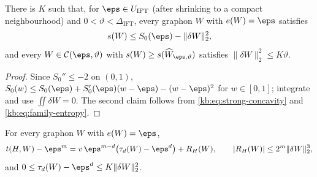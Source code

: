 \begin{lemma}[Localization]\label{kb:lem:localization}
There is $K$ such that, for $\eps\in U_{\mathrm{IFT}}$ (after shrinking to a
compact neighbourhood) and $0<\vartheta<\Delta_{\mathrm{IFT}}$, every graphon
$W$ with $e(W)=\eps$ satisfies
\begin{equation}\label{kb:eq:strong-concavity}
  s(W)\le S_0(\eps)-\|\delta W\|_2^2,
\end{equation}
and every $W\in\mathcal C(\eps,\vartheta)$ with
$s(W)\ge s(\widehat W_{\eps,\vartheta})$ satisfies
$\|\delta W\|_2^2\le K\vartheta$.
\end{lemma}

\begin{proof}
Since $S_0''\le-2$ on $(0,1)$, $S_0(w)\le S_0(\eps)+S_0'(\eps)(w-\eps)-(w-\eps)^2$
for $w\in[0,1]$; integrate and use $\iint\delta W=0$.  The second claim
follows from \eqref{kb:eq:strong-concavity} and
\eqref{kb:eq:family-entropy}.
\end{proof}

\begin{lemma}\label{kb:lem:star}
For every graphon $W$ with $e(W)=\eps$,
\begin{equation}\label{kb:eq:star}
  t(H,W)-\eps^m=v\,\eps^{m-d}\bigl(\tau_d(W)-\eps^d\bigr)+R_H(W),
  \qquad |R_H(W)|\le 2^m\|\delta W\|_2^3,
\end{equation}
and $0\le\tau_d(W)-\eps^d\le K\|\delta W\|_2^2$.
\end{lemma}

